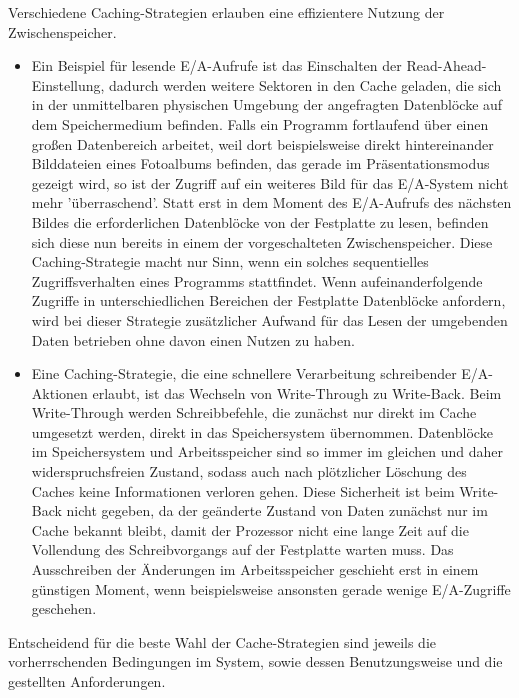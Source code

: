 \documentclass[
	12pt,
	a4paper,
	BCOR10mm,
	DIV14,
	listof=totoc,
	bibliography=totoc,
	headsepline
]{scrreprt}
\begin{document}
Verschiedene Caching-Strategien erlauben eine effizientere Nutzung der Zwischenspeicher.
\begin{itemize}
\item Ein Beispiel für lesende E/A-Aufrufe ist das Einschalten der Read-Ahead-Einstellung, dadurch werden weitere Sektoren in den Cache geladen, die sich in der unmittelbaren physischen Umgebung der angefragten Datenblöcke auf dem  Speichermedium befinden. Falls ein Programm fortlaufend über einen großen Datenbereich arbeitet, weil dort beispielsweise direkt hintereinander Bilddateien eines Fotoalbums befinden, das gerade im Präsentationsmodus gezeigt wird, so ist der Zugriff auf ein weiteres Bild für das E/A-System nicht mehr 'überraschend'. Statt erst in dem Moment des E/A-Aufrufs des nächsten Bildes die erforderlichen Datenblöcke von der Festplatte zu lesen, befinden sich diese nun bereits in einem der vorgeschalteten Zwischenspeicher. Diese Caching-Strategie macht nur Sinn, wenn ein solches sequentielles Zugriffsverhalten eines Programms stattfindet. 
Wenn aufeinanderfolgende Zugriffe in unterschiedlichen Bereichen der Festplatte Datenblöcke anfordern, wird bei dieser Strategie zusätzlicher Aufwand für das Lesen der umgebenden Daten betrieben ohne davon einen Nutzen zu haben. 
\item Eine Caching-Strategie, die eine schnellere Verarbeitung schreibender E/A-Aktionen erlaubt, ist das Wechseln von Write-Through zu Write-Back. Beim Write-Through werden Schreibbefehle, die zunächst nur direkt im Cache umgesetzt werden, direkt in das Speichersystem übernommen. Datenblöcke im Speichersystem und Arbeitsspeicher sind so immer im gleichen und daher widerspruchsfreien Zustand, sodass auch nach plötzlicher Löschung des Caches keine Informationen verloren gehen.
Diese Sicherheit ist beim Write-Back nicht gegeben, da der geänderte Zustand von Daten zunächst nur im Cache bekannt bleibt, damit der Prozessor nicht eine lange Zeit auf die Vollendung des Schreibvorgangs auf der Festplatte warten muss. Das Ausschreiben der Änderungen im Arbeitsspeicher geschieht erst in einem günstigen Moment, wenn beispielsweise ansonsten gerade wenige E/A-Zugriffe geschehen.
\end{itemize}
Entscheidend für die beste Wahl der Cache-Strategien sind jeweils die vorherrschenden Bedingungen im System, sowie dessen Benutzungsweise und die gestellten Anforderungen.
\end{document}

